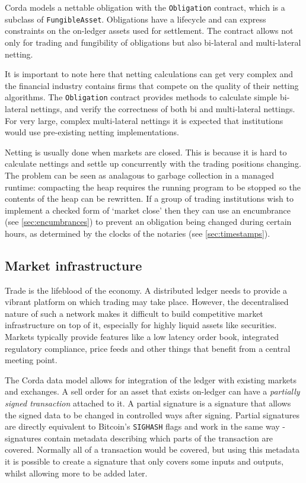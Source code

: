 \documentclass{article}
\begin{document}
Corda models a nettable obligation with the \texttt{Obligation} contract, which is a subclass of
\texttt{FungibleAsset}. Obligations have a lifecycle and can express constraints on the on-ledger assets used
for settlement. The contract allows not only for trading and fungibility of obligations but also bi-lateral and
multi-lateral netting.

It is important to note here that netting calculations can get very complex and the financial industry contains
firms that compete on the quality of their netting algorithms. The \texttt{Obligation} contract provides methods
to calculate  simple bi-lateral nettings, and verify the correctness of both bi and multi-lateral nettings. For
very large, complex multi-lateral nettings it is expected that institutions would use pre-existing netting
implementations.

Netting is usually done when markets are closed. This is because it is hard to calculate nettings and settle up
concurrently with the trading positions changing. The problem can be seen as analagous to garbage collection in
a managed runtime: compacting the heap requires the running program to be stopped so the contents of the heap
can be rewritten. If a group of trading institutions wish to implement a checked form of `market close' then they
can use an encumbrance (see \cref{sec:encumbrances}) to prevent an obligation being changed during certain hours,
as determined by the clocks of the notaries (see \cref{sec:timestamps}).

\subsection{Market infrastructure}

Trade is the lifeblood of the economy. A distributed ledger needs to provide a vibrant platform on which trading may
take place. However, the decentralised nature of such a network makes it difficult to build competitive
market infrastructure on top of it, especially for highly liquid assets like securities. Markets typically provide
features like a low latency order book, integrated regulatory compliance, price feeds and other things that benefit
from a central meeting point.

The Corda data model allows for integration of the ledger with existing markets and exchanges. A sell order for
an asset that exists on-ledger can have a \emph{partially signed transaction} attached to it. A partial
signature is a signature that allows the signed data to be changed in controlled ways after signing. Partial signatures
are directly equivalent to Bitcoin's \texttt{SIGHASH} flags and work in the same way - signatures contain metadata
describing which parts of the transaction are covered. Normally all of a transaction would be covered, but using this
metadata it is possible to create a signature that only covers some inputs and outputs, whilst allowing more to be
added later.
\end{document}
